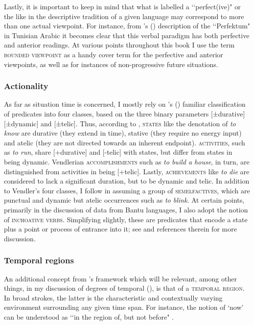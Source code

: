 Lastly, it is important to keep in mind that what is labelled a \lq\lq perfect(ive)" or the like in the descriptive tradition of a given language may correspond to more than one actual viewpoint. For instance, from \citeauthor{Singer1984}'s (\citeyear[298–300]{Singer1984}) description of the \lq\lq Perfektum" in Tunisian Arabic it becomes clear that this verbal paradigm has both perfective and anterior readings. At various points throughout this book I use the term \textsc{bounded viewpoint} as a handy cover term for the perfective and anterior viewpoints, as well as for instances of non-progressive future situations.

\subsubsection{Actionality} As far as situation time is concerned, I mostly rely on \citeauthor{Vendler1957}'s (\citeyear{Vendler1957}) familiar classification of predicates into four classes, based on the three binary parameters [±durative] [±dynamic] and [±telic]. Thus, according to \citeauthor{Vendler1957}, \textsc{states} like the denotation of  \textit{to know} are durative (they extend in time), stative (they require no energy input) and atelic (they are not directed towards an inherent endpoint). \textsc{activities}, such as \textit{to run}, share [+durative] and [-telic] with states, but differ from states in being dynamic. Vendlerian \textsc{accomplishments} such as \textit{to build a house}, in turn, are distinguished from activities in being [+telic]. Lastly, \textsc{achievements} like \textit{to die} are considered to lack a significant duration, but to be dynamic and telic. In addition to Vendler's four classes, I follow \textcite{Smith1997} in assuming a group of \textsc{semelfactives}, which are punctual and dynamic but atelic occurrences such as \textit{to blink}. At certain points, primarily in the discussion of data from Bantu languages, I also adopt the notion of \textsc{inchoative verbs}. Simplifying slightly, these are predicates that encode a state plus a point or process of entrance into it; see \textcite{CranePersohn2019} and references therein for more discussion.

\subsubsection{Temporal regions} An additional concept from \citeauthor{Klein1994}'s framework which will be relevant, among other things, in my discussion of degrees of temporal  (), is that of a \textsc{temporal} \textsc{region}. In broad strokes, the latter is the characteristic and contextually varying environment surrounding any given time span. For instance, the notion of \lq now\rq{ }can be understood as \lq\lq in the region of, but not before"  \parencite[156]{Klein1994}.

